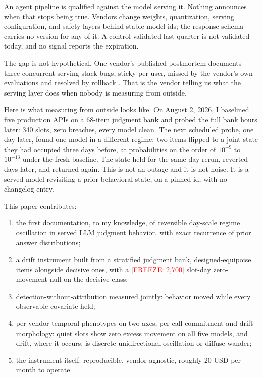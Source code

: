 \documentclass[conference]{IEEEtran}
\newcommand{\freeze}[1]{\textcolor{red}{[FREEZE: #1]}}
\begin{document}
An agent pipeline is qualified against the model serving it.
Nothing announces when that stops being true. Vendors change
weights, quantization, serving configuration, and safety layers
behind stable model ids; the response schema carries no version for
any of it. A control validated last quarter is not validated today,
and no signal reports the expiration.

The gap is not hypothetical. One vendor's published postmortem
documents three concurrent serving-stack bugs, sticky per-user,
missed by the vendor's own evaluations and resolved by rollback
\cite{anthropic-postmortem}. That is the vendor telling us what the
serving layer does when nobody is measuring from outside.

Here is what measuring from outside looks like. On August 2, 2026,
I baselined five production APIs on a 68-item judgment bank and
probed the full bank hours later: 340 slots, zero breaches, every
model clean. The next scheduled probe, one day later, found one
model in a different regime: two items flipped to a joint state
they had occupied three days before, at probabilities on the order
of $10^{-9}$ to $10^{-13}$ under the fresh baseline. The state held
for the same-day rerun, reverted days later, and returned again.
This is not an outage and it is not noise. It is a served model
revisiting a prior behavioral state, on a pinned id, with no
changelog entry.

This paper contributes:
\begin{enumerate}
\renewcommand{\theenumi}{\alph{enumi}}
\renewcommand{\labelenumi}{(\theenumi)}
\item the first documentation, to my knowledge, of reversible
  day-scale regime oscillation in served LLM judgment behavior,
  with exact recurrence of prior answer distributions;
\item a drift instrument built from a stratified judgment bank,
  designed-equipoise items alongside decisive ones, with a
  \freeze{2,700} slot-day zero-movement null on the decisive class;
\item detection-without-attribution measured jointly: behavior
  moved while every observable covariate held;
\item per-vendor temporal phenotypes on two axes, per-call
  commitment and drift morphology: quiet slots show zero excess
  movement on all five models, and drift, where it occurs, is
  discrete unidirectional oscillation or diffuse wander;
\item the instrument itself: reproducible, vendor-agnostic, roughly
  20 USD per month to operate.
\end{enumerate}
\end{document}
